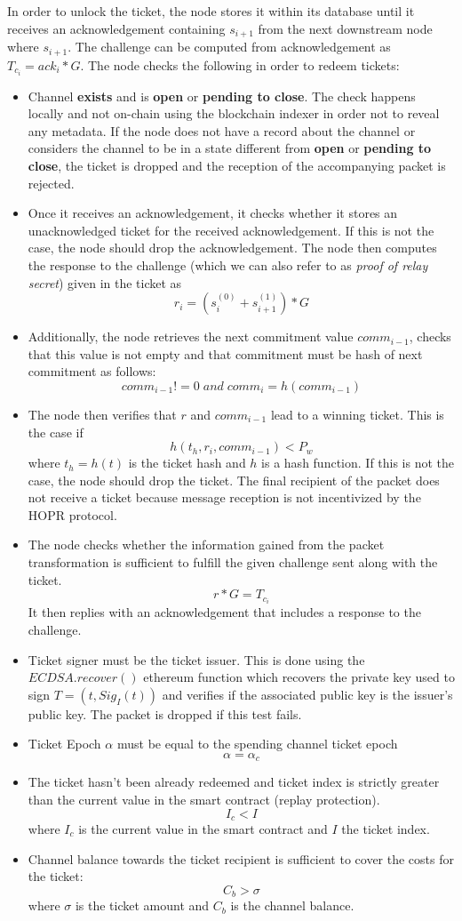 In order to unlock the ticket, the node stores it within its database until it receives an acknowledgement containing $s_{i+1}$ from the next downstream node where $s_{i+1}$. The challenge can be computed from acknowledgement as $T_{c_i}=ack_i*G$. The node checks the following in order to redeem tickets:
\begin{itemize}
\item Channel \textbf{exists} and is \textbf{open} or \textbf{pending to close}. The check happens locally and not on-chain using the blockchain indexer in order not to reveal any metadata. If the node does not have a record about the channel or considers the channel to be in a state different from \textbf{open} or \textbf{pending to close}, the ticket is dropped and the reception of the accompanying packet is rejected.

    \item Once it receives an acknowledgement, it checks whether it stores an unacknowledged ticket for the received acknowledgement.
If this is not the case, the node should drop the acknowledgement.
\newline The node then computes the response to the challenge (which we can also refer to as \textit{proof of relay secret}) given in the ticket as $$r_i=(s_i^{(0)}+s_{i+1}^{(1)})*G$$
\item Additionally, the node retrieves the next commitment value $comm_{i-1}$, checks that this value is not empty and that commitment must be hash of next commitment as follows:
$$ comm_{i-1} != 0 \; and \; comm_{i}=h(comm_{i-1})$$
\item The node then verifies that $r$ and $comm_{i-1}$ lead to a winning ticket.
This is the case if $$h(t_h, r_i, comm_{i-1} ) <P_w$$ where $t_h=h(t)$ is the ticket hash and $h$ is a hash function.
If this is not the case, the node should drop the ticket.
The final recipient of the packet does not receive a ticket because message reception is not incentivized by the HOPR protocol.
\item  The node checks whether the information gained from the packet transformation is sufficient to fulfill the given challenge sent along with the ticket. $$r*G=T_{c_i}$$
It then replies with an acknowledgement that includes a response to the challenge.
\item Ticket signer must be the ticket issuer. This is done using the $ECDSA.recover()$ ethereum function which recovers the private key used to sign $T= (t, Sig_I(t))$ and verifies if the associated public key is the issuer's public key. The packet is dropped if this test fails.
\item Ticket Epoch $\alpha$ must be equal to the spending channel ticket epoch $$\alpha=\alpha_c$$
\item The ticket hasn't been already redeemed and ticket index is strictly greater than the current value in the smart contract (replay protection).
     $$I_c <I$$ where $I_c$ is the current value in the smart contract and $I$ the ticket index.
\item Channel balance towards the ticket recipient is sufficient to cover the costs for the ticket: $$ C_b>\sigma$$ where $\sigma$ is the ticket amount and $C_b$ is the channel balance.
   



\end{itemize}
